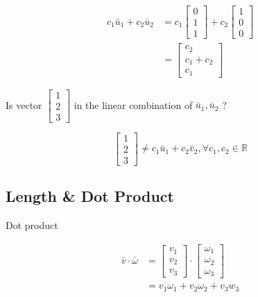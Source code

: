 \documentclass[main.tex]{subfiles}
\begin{document}
    $$
    \begin{aligned}
    c_{1} \bar{u}_{1}+c_{2} \bar{u}_{2} & = c_{1}\left[\begin{array}{l}0 \\ 1 \\ 1\end{array}\right]
                                        + c_{2}\left[\begin{array}{l}1 \\ 0 \\ 0\end{array}\right]\\
                                        & = \left[\begin{array}{c}c_{2} \\ c_{1}+c_{2} \\ c_{1}\end{array}\right]
    \end{aligned}
    $$
    
    Is vector $\left[\begin{array}{l}1 \\ 2 \\ 3\end{array}\right]$ in the linear combination of $\bar{u}_{1}, \bar{u}_{2}$ ?
    
    $$
    \left[\begin{array}{l}
    1 \\
    2 \\
    3
    \end{array}\right] \neq c_{1} \bar{u}_{1}+c_{2} \bar{v}_{2}, \forall c_{1}, c_{2} \in \mathbb{R}
    $$

\subsection{Length \& Dot Product}

    Dot product

    $$
    \begin{aligned}
    \bar{v} \cdot \bar{\omega} &=\left[\begin{array}{l}
    v_{1} \\
    v_{2} \\
    v_{3}
    \end{array}\right] \cdot\left[\begin{array}{l}
    \omega_{1} \\
    \omega_{2} \\
    \omega_{3}
    \end{array}\right]\\
    & = v_{1} \omega_{1} + v_{2} \omega_{2} + v_{3} w_{3}
    \end{aligned}
    $$
    
\end{document}
